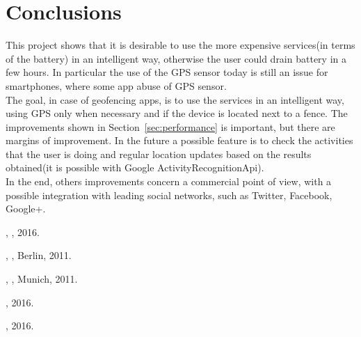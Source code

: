 \documentclass[conference]{IEEEtran}
\begin{document}
\section{Conclusions}
This project shows that it is desirable to use the more expensive services(in terms of the battery) in an intelligent way, otherwise the user could drain battery in a few hours.
In particular the use of the GPS sensor today is still an issue for smartphones, where some app abuse of GPS sensor. \\
The goal, in case of geofencing apps, is to use the services in an intelligent way, using GPS only when necessary and if the device is located next to a fence.
The improvements shown in Section~\ref{sec:performance} is important, but there are margins of improvement.
In the future a possible feature is to check the activities that the user is doing and regular location updates based on the results obtained(it is possible with Google ActivityRecognitionApi).\\
In the end, others improvements concern a commercial point of view, with a possible integration with leading social networks, such as Twitter, Facebook, Google+.


\begin{thebibliography}{15}

\label{bib:egigeozone}
,
, 2016.

\label{bib:lbss}
,
, Berlin, 2011.

\label{bib:proactive}
,
, Munich, 2011.

\label{bib:googlefence}
, 2016.

\label{bib:googlelbs}
, 2016.

\end{thebibliography}
\end{document}
